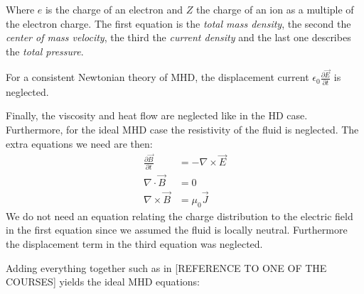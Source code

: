 {\centering 
\noindent {}
\par}

Where $e$ is the charge of an electron and $Z$ the charge of an ion as a multiple of the electron charge. The first equation is the \emph{total mass density}, the second the \emph{center of mass velocity}, the third the \emph{current density} and the last one describes the \emph{total pressure}.

For a consistent Newtonian theory of MHD, the displacement current $\epsilon_0 \frac{\partial \vec{E}}{\partial t}$ is neglected. 

Finally, the viscosity and heat flow are neglected like in the HD case. Furthermore, for the ideal MHD case the resistivity of the fluid is neglected. The extra equations we need are then:
\begin{align*}
	\frac{\partial \vec{B}}{\partial t} &= - \nabla \times \vec{E}\\
	\nabla \cdot \vec{B} &= 0\\
	\nabla \times \vec{B} &= \mu_0 \vec{J}
\end{align*}
We do not need an equation relating the charge distribution to the electric field in the first equation since we assumed the fluid is locally neutral.
Furthermore the displacement term in the third equation was neglected.

Adding everything together such as in [REFERENCE TO ONE OF THE COURSES] yields the ideal MHD equations:

{\centering 
\noindent {}
\par}

